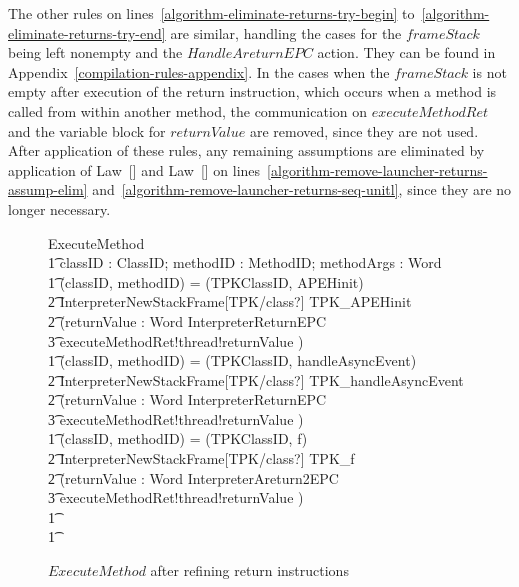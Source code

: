 The other rules on lines~\ref{algorithm-eliminate-returns-try-begin}
to~\ref{algorithm-eliminate-returns-try-end} are similar, handling the
cases for the $frameStack$ being left nonempty and the
$HandleAreturnEPC$ action.
They can be found in Appendix~\ref{compilation-rules-appendix}.
In the cases when the $frameStack$ is not empty after execution of the
return instruction, which occurs when a method is called from within
another method, the communication on $executeMethodRet$ and the
variable block for $returnValue$ are removed, since they are not used.
After application of these rules, any remaining assumptions are
eliminated by application of Law~[] and
Law~[] on
lines~\ref{algorithm-remove-launcher-returns-assump-elim}
and~\ref{algorithm-remove-launcher-returns-seq-unitl}, since they are
no longer necessary.

\begin{figure}[tp!]
  \centering
  \begin{circusaction}
    ExecuteMethod \circdef \\
    \t1 \circval classID : ClassID; \circval methodID : MethodID; \circval methodArgs : \seq Word \circspot \\
    \t1 \circif (classID, methodID) = (TPKClassID, APEHinit) \circthen {} \\
    \t2 InterpreterNewStackFrame[TPK/class?] \circseq TPK\_APEHinit \circseq \\
    \t2 (\circvar returnValue : Word \circspot \lschexpract InterpreterReturnEPC \rschexpract \circseq \\
    \t3 executeMethodRet!thread!returnValue \then \Skip) \\
    \t1 {} \circelse (classID, methodID) = (TPKClassID, handleAsyncEvent) \circthen {} \\
    \t2 InterpreterNewStackFrame[TPK/class?] \circseq TPK\_handleAsyncEvent \circseq \\
    \t2 (\circvar returnValue : Word \circspot \lschexpract InterpreterReturnEPC \rschexpract \circseq \\
    \t3 executeMethodRet!thread!returnValue \then \Skip) \\
    \t1 {} \circelse (classID, methodID) = (TPKClassID, f) \circthen {} \\
    \t2 InterpreterNewStackFrame[TPK/class?] \circseq TPK\_f \circseq \\
    \t2 (\circvar returnValue : Word \circspot \lschexpract InterpreterAreturn2EPC \rschexpract \circseq \\
    \t3 executeMethodRet!thread!returnValue \then \Skip) \\
    \t1 {} \cdots {} \\
    \t1 \circfi
  \end{circusaction}
  \caption{$ExecuteMethod$ after refining return instructions}
  \label{efs-ExecutMethod-refined-return-instructions-figure}
\end{figure}


